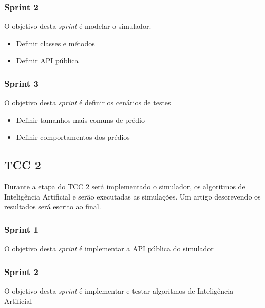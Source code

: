 \subsubsection{Sprint 2}
O objetivo desta \textit{sprint} é modelar o simulador.
\begin{itemize}
    \item Definir classes e métodos
    \item Definir API pública
\end{itemize}

\subsubsection{Sprint 3}
O objetivo desta \textit{sprint} é definir os cenários de testes
\begin{itemize}
    \item Definir tamanhos mais comuns de prédio
    \item Definir comportamentos dos prédios
\end{itemize}

\subsection{TCC 2}
Durante a etapa do TCC 2 será implementado o simulador, os algoritmos de
Inteligência Artificial e serão executadas as simulações. Um artigo descrevendo
os resultados será escrito ao final.

\subsubsection{Sprint 1}
O objetivo desta \textit{sprint} é implementar a API pública do simulador

\subsubsection{Sprint 2}
O objetivo desta \textit{sprint} é implementar e testar algoritmos de
Inteligência Artificial